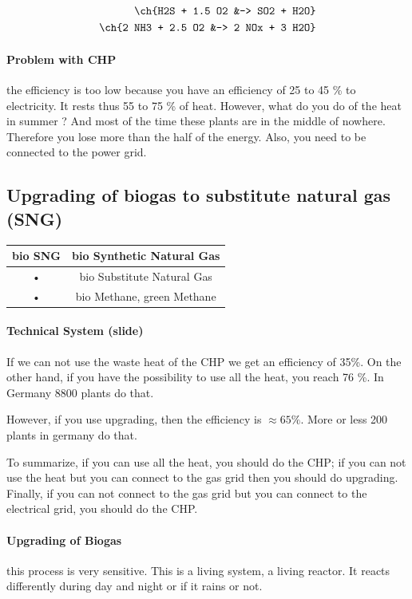 \documentclass[10pt,a4paper]{article}
\begin{document}
\begin{align*}
\ch{H2S + 1.5 O2 &-> SO2 + H2O} \\
\ch{2 NH3 + 2.5 O2 &-> 2 NOx + 3 H2O}
\end{align*}

\paragraph{Problem with CHP}the efficiency is too low because you have an efficiency of 25 to 45 \% to electricity. It rests thus 55 to 75 \% of heat. However, what do you do of the heat in summer ? And most of the time these plants are in the middle of nowhere. Therefore you lose more than the half of the energy. Also, you need to be connected to the power grid.

\subsection{Upgrading of biogas to substitute natural gas (SNG)}

\begin{tabular}{|c|c|}
\hline 
bio SNG & bio Synthetic Natural Gas \\ 
\hline 
• & bio Substitute Natural Gas \\ 
\hline 
• & bio Methane, green Methane \\ 
\hline 
\end{tabular} 


\paragraph{Technical System (slide)}If we can not use the waste heat of the CHP we get an efficiency of 35\%. On the other hand, if you have the possibility to use all the heat, you reach 76 \%. In Germany 8800 plants do that.

However, if you use upgrading, then the efficiency is $\approx 65 \%$. More or less 200 plants in germany do that.

To summarize, if you can use all the heat, you should do the CHP; if you can not use the heat but you can connect to the gas grid then you should do upgrading. Finally, if you can not connect to the gas grid but you can connect to the electrical grid, you should do the CHP.

\paragraph{Upgrading of Biogas}this process is very sensitive. This is a living system, a living reactor. It reacts differently during day and night or if it rains or not.
\end{document}
